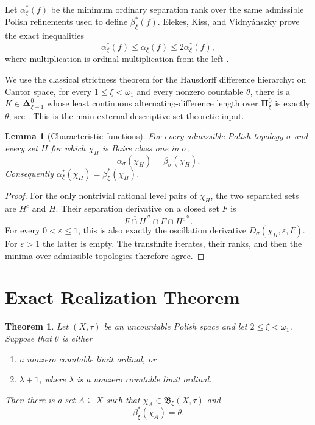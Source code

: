 \documentclass[11pt]{article}
\newtheorem{theorem}{Theorem}
\newtheorem{lemma}{Lemma}
\newcommand{\B}{\mathfrak{B}}
\newcommand{\bPi}{\boldsymbol{\Pi}}
\newcommand{\bDelta}{\boldsymbol{\Delta}}
\begin{document}
Let $\alpha^*_\xi(f)$ be the minimum ordinary separation rank over the same
admissible Polish refinements used to define $\beta^*_\xi(f)$.  Elekes, Kiss,
and Vidny\'anszky prove the exact inequalities
\begin{equation}\label{eq:comparison}
  \alpha^*_\xi(f)\leq\alpha_\xi(f)
  \leq 2\alpha^*_\xi(f),
\end{equation}
where multiplication is ordinal multiplication from the left
\cite[Theorem 5.17]{EKV}.

We use the classical strictness theorem for the Hausdorff difference
hierarchy: on Cantor space, for every $1\leq\xi<\omega_1$ and every nonzero
countable $\theta$, there is a $K\in\bDelta^0_{\xi+1}$ whose least
continuous alternating-difference length over $\bPi^0_\xi$ is exactly
$\theta$; see \cite[Section 22]{Kechris}.  This is the main external
descriptive-set-theoretic input.

\begin{lemma}[Characteristic functions]\label{lem:characteristic}
For every admissible Polish topology $\sigma$ and every set $H$ for which
$\chi_H$ is Baire class one in $\sigma$,
\[
  \alpha_\sigma(\chi_H)=\beta_\sigma(\chi_H).
\]
Consequently $\alpha^*_\xi(\chi_H)=\beta^*_\xi(\chi_H)$.
\end{lemma}

\begin{proof}
For the only nontrivial rational level pairs of $\chi_H$, the two separated
sets are $H^c$ and $H$.  Their separation derivative on a closed set $F$ is
\[
 \overline{F\cap H}^{\,\sigma}\cap
 \overline{F\cap H^c}^{\,\sigma}.
\]
For every $0<\varepsilon\leq1$, this is also exactly the oscillation
derivative $D_\sigma(\chi_H,\varepsilon,F)$.  For $\varepsilon>1$ the latter
is empty.  The transfinite iterates, their ranks, and then the minima over
admissible topologies therefore agree.
\end{proof}

\section*{Exact Realization Theorem}

\begin{theorem}\label{thm:main}
Let $(X,\tau)$ be an uncountable Polish space and let
$2\leq\xi<\omega_1$.  Suppose that $\theta$ is either
\begin{enumerate}
  \item a nonzero countable limit ordinal, or
  \item $\lambda+1$, where $\lambda$ is a nonzero countable limit ordinal.
\end{enumerate}
Then there is a set $A\subseteq X$ such that $\chi_A\in\B_\xi(X,\tau)$ and
\[
  \beta^*_\xi(\chi_A)=\theta.
\]
\end{theorem}
\end{document}
